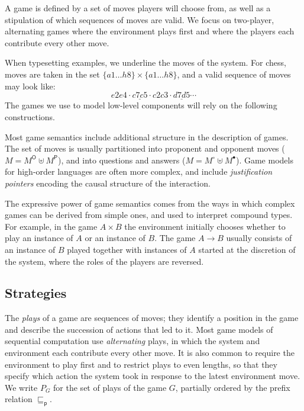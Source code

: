 \documentclass[draft,11pt]{report}
\newcommand{\kw}[1]{\ensuremath{ \mathsf{#1} }}
\newcommand{\que}{\circ}         %
\newcommand{\ans}{\bullet}       %
\newcommand{\pref}{\sqsubseteq_\kw{p}}  %
\begin{document}
A game is defined by a set of moves
players will choose from,
as well as a stipulation of which
sequences of moves are valid.
We focus on two-player, alternating games
where the environment plays first and
where the players
each contribute every other move.

When typesetting examples,
we underline the moves of the system.
For chess,
moves are taken in the set $\{a1 \ldots h8\} \times \{a1 \ldots h8\}$,
and a valid sequence of moves may look like:
\[ e2e4 \cdot \underline{c7c5} \cdot c2c3 \cdot \underline{d7d5} \cdots \]
The games we use to model low-level components
will rely on the following constructions.

Most game semantics
include additional structure
in the description of games.
The set of moves is usually partitioned
into proponent and opponent moves ($M = M^\kw{O} \uplus M^\kw{P}$),
and into questions and answers ($M = M^\que \uplus M^\ans$).
Game models for high-order languages are often more complex,
and include \emph{justification pointers}
encoding the causal structure of the interaction.

The expressive power of game semantics
comes from the ways in which complex games can be derived from simple ones,
and used to interpret compound types.
For example,
in the game $A \times B$
the environment initially chooses whether to play
an instance of $A$ or an instance of $B$.
The game $A \rightarrow B$ usually consists of
an instance of $B$ played
together with instances of $A$
started at the discretion of the system,
where the roles of the players are reversed.


\subsection{Strategies} %

The \emph{plays} of a game are sequences of moves;
they identify a position in the game
and describe the succession of actions that led to it.
Most game models of sequential computation
use \emph{alternating} plays,
in which
the system and environment each contribute
every other move.
It is also common to require the environment to play first
and to restrict plays to even lengths,
so that they specify which action the system took
in response to the latest environment move.
We write $P_G$ for the set of plays of the game $G$,
partially ordered by the prefix relation $\pref$.
\end{document}

